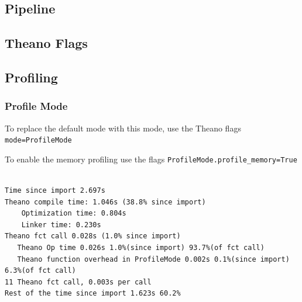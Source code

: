 \documentclass[a4paper,9pt]{beamer}
\begin{document}
\subsection{Pipeline}

\subsection{Theano Flags}

\subsection{Profiling}
\begin{frame}[fragile]
\frametitle{Profile Mode}
To replace the default mode with this mode, use the Theano flags \texttt{mode=ProfileMode}

To enable the memory profiling use the flags \texttt{ProfileMode.profile\_memory=True} 
\begin{Verbatim}

Time since import 2.697s
Theano compile time: 1.046s (38.8% since import)
    Optimization time: 0.804s
    Linker time: 0.230s
Theano fct call 0.028s (1.0% since import)
   Theano Op time 0.026s 1.0%(since import) 93.7%(of fct call)
   Theano function overhead in ProfileMode 0.002s 0.1%(since import) 6.3%(of fct call)
11 Theano fct call, 0.003s per call
Rest of the time since import 1.623s 60.2%
\end{Verbatim}
\end{frame}
\end{document}
